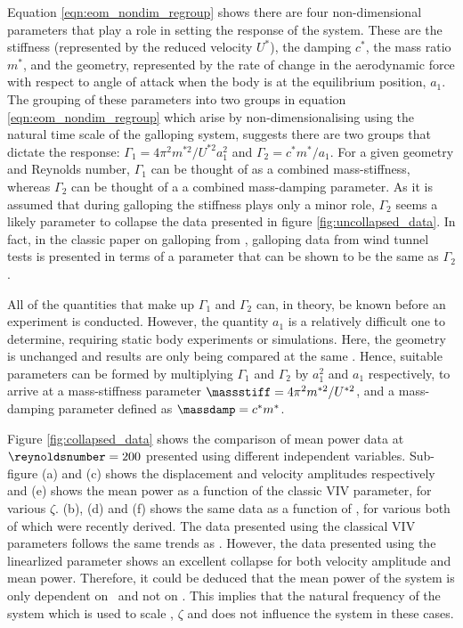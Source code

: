  Equation \ref{eqn:eom_nondim_regroup} shows there are four non-dimensional parameters that play a role in setting the response of the system. These are the stiffness (represented by the reduced velocity $U^*$), the damping $c^*$, the mass ratio $m^*$, and the geometry, represented by the rate of change in the aerodynamic force with respect to angle of attack when the body is at the equilibrium position, $a_1$. The grouping of these parameters into two groups in equation \ref{eqn:eom_nondim_regroup} which arise by non-dimensionalising using the natural time scale of the galloping system, suggests there are two groups that dictate the response: $\Gamma_1 = 4\pi^2m^{*2}/U^{*2}a_1^2$ and $\Gamma_2 = c^*m^*/a_1$. For a given geometry and Reynolds number, $\Gamma_1$ can be thought of as a combined mass-stiffness, whereas $\Gamma_2$ can be thought of a a combined mass-damping parameter. As it is assumed that during galloping the stiffness plays only a minor role, $\Gamma_2$ seems a likely parameter to collapse the data presented in figure \ref{fig:uncollapsed_data}. In fact, in the classic paper on galloping from \citet{Parkinson1964}, galloping data from wind tunnel tests is presented in terms of a parameter that can be shown to be the same as $\Gamma_2$.
 
 All of the quantities that make up $\Gamma_1$ and $\Gamma_2$ can, in theory, be known before an experiment is conducted. However, the quantity $a_1$ is a relatively difficult one to determine, requiring static body experiments or simulations. Here, the geometry is unchanged and results are only being compared at the same \reynoldsnumber. Hence, suitable parameters can be formed by multiplying $\Gamma_1$ and $\Gamma_2$ by $a_1^2$ and $a_1$ respectively, to arrive at a mass-stiffness parameter $\massstiff =  4\pi^2m^{*2}/U^{*2}$, and a mass-damping parameter defined as $\massdamp = c^*m^*$.
 
 
%   
  
   Figure \ref{fig:collapsed_data} shows the comparison of mean power data at $\reynoldsnumber=200$ presented using different independent variables. Sub-figure (a) and (c) shows the displacement and velocity amplitudes respectively and (e) shows the mean power as a function of the classic VIV parameter, \ustar for various $\zeta$. (b), (d) and (f) shows the same data as a function of \massdamp, for various \massstiff both of which were recently derived. The data presented using the classical VIV parameters follows the same trends as \cite{Barrero-Gil2010a}. However, the data presented using the linearlized parameter shows an excellent collapse for both velocity amplitude and mean power. Therefore, it could be deduced that the mean power  of the system is only dependent on \massdamp \ and not on \massstiff. This implies that the natural frequency of the system which is used to scale \ustar, $\zeta$ and \massstiff does not influence the system in these cases.
   

